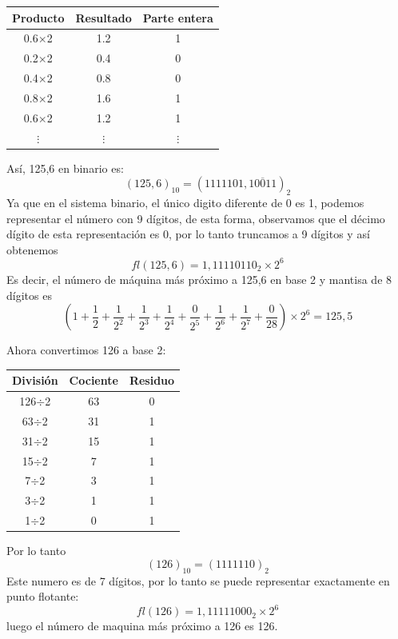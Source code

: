 \documentclass[12pt, a4paper]{article}%
\begin{document}
\begin{itemize}
\begin{itemize}
\begin{solution}
\begin{center}
                \begin{tabular}{|c|c|c|}\hline
                   Producto & Resultado & Parte entera \\ \hline
                    0.6$\times$2 & 1.2 & 1 \\
                    0.2$\times$2 & 0.4 & 0 \\
                    0.4$\times$2 & 0.8 & 0 \\
                    0.8$\times$2 & 1.6 & 1 \\
                    0.6$\times$2 & 1.2 & 1\\
                    $\vdots$ & $\vdots$ & $\vdots$ \\ \hline
                \end{tabular}
            \end{center}
            Así, 125,6 en binario es:
            \[
            (125,6)_{10}=(1111101,\overline{10011})_{2}
            \]
            Ya que en el sistema binario, el único digito diferente de 0 es 1, podemos representar el número con 9 dígitos, de esta forma, observamos que el décimo dígito de esta representación es 0, por lo tanto truncamos a 9 dígitos y así obtenemos
            \[
            fl(125,6)=1,11110110_{2}\times2^{6}
            \]
            Es decir, el número de máquina más próximo a 125,6 en base 2 y mantisa de 8 dígitos es 
            \[
        \left(1+\frac{1}{2}+\frac{1}{2^{2}}+\frac{1}{2^{3}}+\frac{1}{2^{4}}+\frac{0}{2^{5}}+\frac{1}{2^{6}}+\frac{1}{2^{7}}+\frac{0}{2{8}}\right)\times 2^{6}=125,5 
            \]
            
            Ahora convertimos 126 a base 2:
            \begin{center}
            \renewcommand{\arraystretch}{1.2}
                \begin{tabular}{|c|c|c|}\hline
                División & Cociente & Residuo\\ \hline
                126$\div$2 & 63 & 0 \\ 
                63$\div$2 & 31 & 1 \\ 
                31$\div$2 & 15 & 1 \\
                15$\div$2 & 7 & 1 \\
                7$\div$2 & 3 & 1 \\
                3$\div$2 & 1 & 1 \\
                1$\div$2 & 0 & 1\\ \hline
                \end{tabular}
            \end{center}
            Por lo tanto
            \[
            (126)_{10}=(1111110)_{2}
            \]
            Este numero es de 7 dígitos, por lo tanto se puede representar exactamente en punto flotante:
            \[
            fl(126)=1,11111000_{2}\times2^{6}
            \]
            luego el número de maquina más próximo a 126 es 126.
            

\end{solution}
\end{itemize}
\end{itemize}
\end{document}
